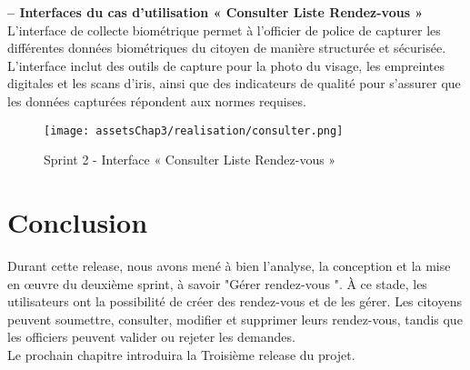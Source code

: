 \textbf{– Interfaces du cas d'utilisation « Consulter Liste Rendez-vous »}\\
L'interface de collecte biométrique permet à l'officier de police de capturer les différentes données biométriques du citoyen de manière structurée et sécurisée. L'interface inclut des outils de capture pour la photo du visage, les empreintes digitales et les scans d'iris, ainsi que des indicateurs de qualité pour s'assurer que les données capturées répondent aux normes requises.

\begin{figure}[H]
\centering
\texttt{[image: assetsChap3/realisation/consulter.png]}
\caption{ Sprint 2 - Interface « Consulter Liste Rendez-vous » }
\end{figure}




\section*{Conclusion}
Durant cette release, nous avons mené à bien l'analyse, la conception et la mise en œuvre du deuxième sprint, à savoir "Gérer rendez-vous ". À ce stade, les utilisateurs ont la possibilité de créer des rendez-vous et de les gérer. Les citoyens peuvent soumettre, consulter, modifier et supprimer leurs rendez-vous, tandis que les officiers peuvent valider ou rejeter les demandes.
\\ Le prochain chapitre introduira la Troisième release du projet.
\label{sec_Conclusion}




